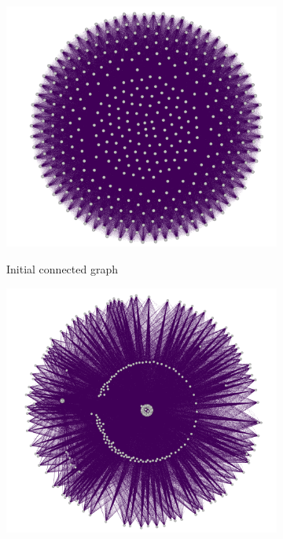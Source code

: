\begin{figure}[H]

\begin{subfigure}{.33\textwidth}
  \centering
  \includegraphics[width=\textwidth]{fig/step1.png}
  \label{fig:orig}
  \caption{Initial connected graph}
\end{subfigure}%
\begin{subfigure}{.33\textwidth}
  \centering
  \includegraphics[width=\textwidth]{fig/step2.png}

\end{subfigure}
\end{figure}

